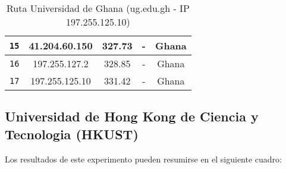 \begin{table}[ht]
\begin{center}
\begin{tabular}{|c|c|c|c|c|}
    \texttt{15} & 41.204.60.150   & 327.73            & -                          & Ghana                          \\ \hline
    \texttt{16} & 197.255.127.2   & 328.85            & -                          & Ghana                          \\ \hline
    \texttt{17} & 197.255.125.10  & 331.42            & -                          & Ghana                          \\ \hline
    \end{tabular}
    \caption{Ruta Universidad de Ghana (ug.edu.gh  - IP 197.255.125.10)}
\end{center}
\end{table}

\begin{figure}[h]
    \centering
\end{figure}


\subsection{Universidad de Hong Kong de Ciencia y Tecnologia (HKUST)}

Los resultados de este experimento pueden resumirse en el siguiente cuadro:

